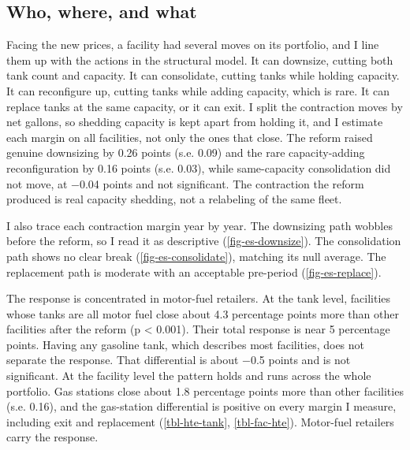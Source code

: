 \documentclass[
  12pt,
]{article}
\begin{document}
\subsection{Who, where, and what}\label{who-where-and-what}

Facing the new prices, a facility had several moves on its portfolio,
and I line them up with the actions in the structural model. It can
downsize, cutting both tank count and capacity. It can consolidate,
cutting tanks while holding capacity. It can reconfigure up, cutting
tanks while adding capacity, which is rare. It can replace tanks at the
same capacity, or it can exit. I split the contraction moves by net
gallons, so shedding capacity is kept apart from holding it, and I
estimate each margin on all facilities, not only the ones that close.
The reform raised genuine downsizing by 0.26 points (s.e. 0.09) and the
rare capacity-adding reconfiguration by 0.16 points (s.e. 0.03), while
same-capacity consolidation did not move, at −0.04 points and not
significant. The contraction the reform produced is real capacity
shedding, not a relabeling of the same fleet.

I also trace each contraction margin year by year. The downsizing path
wobbles before the reform, so I read it as descriptive
(\autoref{fig-es-downsize}). The consolidation path shows no clear break
(\autoref{fig-es-consolidate}), matching its null average. The
replacement path is moderate with an acceptable pre-period
(\autoref{fig-es-replace}).

The response is concentrated in motor-fuel retailers. At the tank level,
facilities whose tanks are all motor fuel close about 4.3 percentage
points more than other facilities after the reform (p \textless{}
0.001). Their total response is near 5 percentage points. Having any
gasoline tank, which describes most facilities, does not separate the
response. That differential is about −0.5 points and is not significant.
At the facility level the pattern holds and runs across the whole
portfolio. Gas stations close about 1.8 percentage points more than
other facilities (s.e. 0.16), and the gas-station differential is
positive on every margin I measure, including exit and replacement
(\autoref{tbl-hte-tank}, \autoref{tbl-fac-hte}). Motor-fuel retailers
carry the response.
\end{document}
